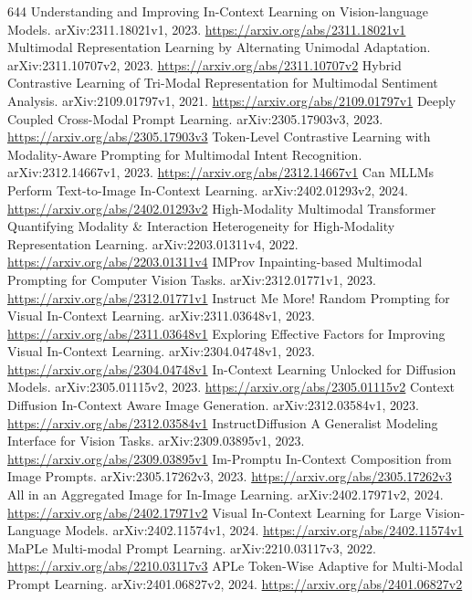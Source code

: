 \documentclass[11pt]{article}
\begin{document}
\begin{thebibliography}{644}
 Understanding and Improving In-Context Learning on Vision-language Models. arXiv:2311.18021v1, 2023. \url{https://arxiv.org/abs/2311.18021v1}
 Multimodal Representation Learning by Alternating Unimodal Adaptation. arXiv:2311.10707v2, 2023. \url{https://arxiv.org/abs/2311.10707v2}
 Hybrid Contrastive Learning of Tri-Modal Representation for Multimodal Sentiment Analysis. arXiv:2109.01797v1, 2021. \url{https://arxiv.org/abs/2109.01797v1}
 Deeply Coupled Cross-Modal Prompt Learning. arXiv:2305.17903v3, 2023. \url{https://arxiv.org/abs/2305.17903v3}
 Token-Level Contrastive Learning with Modality-Aware Prompting for Multimodal Intent Recognition. arXiv:2312.14667v1, 2023. \url{https://arxiv.org/abs/2312.14667v1}
 Can MLLMs Perform Text-to-Image In-Context Learning. arXiv:2402.01293v2, 2024. \url{https://arxiv.org/abs/2402.01293v2}
 High-Modality Multimodal Transformer Quantifying Modality \& Interaction Heterogeneity for High-Modality Representation Learning. arXiv:2203.01311v4, 2022. \url{https://arxiv.org/abs/2203.01311v4}
 IMProv Inpainting-based Multimodal Prompting for Computer Vision Tasks. arXiv:2312.01771v1, 2023. \url{https://arxiv.org/abs/2312.01771v1}
 Instruct Me More! Random Prompting for Visual In-Context Learning. arXiv:2311.03648v1, 2023. \url{https://arxiv.org/abs/2311.03648v1}
 Exploring Effective Factors for Improving Visual In-Context Learning. arXiv:2304.04748v1, 2023. \url{https://arxiv.org/abs/2304.04748v1}
 In-Context Learning Unlocked for Diffusion Models. arXiv:2305.01115v2, 2023. \url{https://arxiv.org/abs/2305.01115v2}
 Context Diffusion In-Context Aware Image Generation. arXiv:2312.03584v1, 2023. \url{https://arxiv.org/abs/2312.03584v1}
 InstructDiffusion A Generalist Modeling Interface for Vision Tasks. arXiv:2309.03895v1, 2023. \url{https://arxiv.org/abs/2309.03895v1}
 Im-Promptu In-Context Composition from Image Prompts. arXiv:2305.17262v3, 2023. \url{https://arxiv.org/abs/2305.17262v3}
 All in an Aggregated Image for In-Image Learning. arXiv:2402.17971v2, 2024. \url{https://arxiv.org/abs/2402.17971v2}
 Visual In-Context Learning for Large Vision-Language Models. arXiv:2402.11574v1, 2024. \url{https://arxiv.org/abs/2402.11574v1}
 MaPLe Multi-modal Prompt Learning. arXiv:2210.03117v3, 2022. \url{https://arxiv.org/abs/2210.03117v3}
 APLe Token-Wise Adaptive for Multi-Modal Prompt Learning. arXiv:2401.06827v2, 2024. \url{https://arxiv.org/abs/2401.06827v2}

\end{thebibliography}
\end{document}
